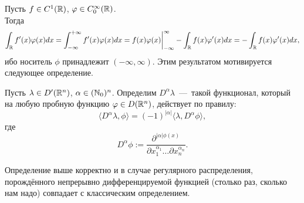 \begin{note}
    Пусть $f \in C^1(\mathbb{R})$, $\varphi \in C^{\infty}_0(\mathbb{R})$. \\
    Тогда
    \[
        \int_{\mathbb{R}} f'(x)\varphi(x) dx = \int_{-\infty}^{+\infty} f'(x) \varphi(x) dx = f(x)\varphi(x) \bigg|^{\infty}_{-\infty} - \int_{\mathbb{R}}f(x) \varphi'(x) dx = -\int_{\mathbb{R}}f(x) \varphi'(x) dx,
    \]
    ибо носитель $\phi$ принадлежит $(-\infty, \infty)$.
    Этим результатом мотивируется следующее определение.
\end{note}
\begin{definition}
    Пусть $\lambda \in D'(\mathbb{R}^n)$, $\alpha \in (\mathbb{N}_0)^n$.
    Определим $D^\alpha \lambda$~---~такой функционал, который на любую пробную  функцию $\varphi \in D(\mathbb{R}^n)$, действует по правилу:
    \[
        \langle D^{\alpha} \lambda, \phi \rangle = (-1)^{|\alpha|} \langle \lambda, D^{\alpha}\phi \rangle,
    \]
    где
    \[
        D^{\alpha}\phi:= \dfrac{\partial^{|\alpha|\phi(x)}}{\partial x_1^{\alpha_1}\dots\partial x_n^{\alpha_n}}.
    \]
\end{definition}
\begin{theorem}
    Определение выше корректно и в случае регулярного распределения, порождённого непрерывно дифференцируемой функцией (столько раз, сколько нам надо) совпадает с классическим определением.
\end{theorem}
